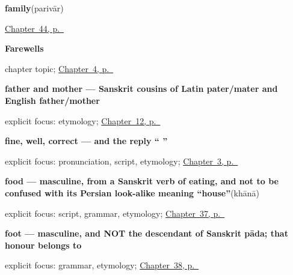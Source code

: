 \noindent\begin{minipage}[t]{\linewidth}
\raggedright
\textbf{family}\enspace\emph{}\enspace(parivār)\par
\footnotesize \hyperref[ch:hi-sons-daughters]{Chapter~44, p.~\pageref*{ch:hi-sons-daughters}}
\end{minipage}\par\smallskip

\noindent\begin{minipage}[t]{\linewidth}
\raggedright
\textbf{Farewells}\par
\footnotesize chapter topic; \hyperref[ch:farewells]{Chapter~4, p.~\pageref*{ch:farewells}}
\end{minipage}\par\smallskip

\noindent\begin{minipage}[t]{\linewidth}
\raggedright
\textbf{father and mother — Sanskrit cousins of Latin pater/mater and English father/mother}\enspace\emph{ }\par
\footnotesize explicit focus: etymology; \hyperref[ch:hi-family]{Chapter~12, p.~\pageref*{ch:hi-family}}
\end{minipage}\par\smallskip

\noindent\begin{minipage}[t]{\linewidth}
\raggedright
\textbf{fine, well, correct — and the reply \textquotedblleft{}  \textquotedblright{}}\enspace\emph{}\par
\footnotesize explicit focus: pronunciation, script, etymology; \hyperref[ch:responding]{Chapter~3, p.~\pageref*{ch:responding}}
\end{minipage}\par\smallskip

\noindent\begin{minipage}[t]{\linewidth}
\raggedright
\textbf{food — masculine, from a Sanskrit verb of eating, and not to be confused with its Persian look-alike meaning \textquotedblleft{}house\textquotedblright{}}\enspace\emph{}\enspace(khānā)\par
\footnotesize explicit focus: script, grammar, etymology; \hyperref[ch:hi-one-tea-please]{Chapter~37, p.~\pageref*{ch:hi-one-tea-please}}
\end{minipage}\par\smallskip

\noindent\begin{minipage}[t]{\linewidth}
\raggedright
\textbf{foot — masculine, and NOT the descendant of Sanskrit pāda; that honour belongs to }\enspace\emph{}\par
\footnotesize explicit focus: grammar, etymology; \hyperref[ch:hi-where-it-hurts]{Chapter~38, p.~\pageref*{ch:hi-where-it-hurts}}
\end{minipage}\par\smallskip

